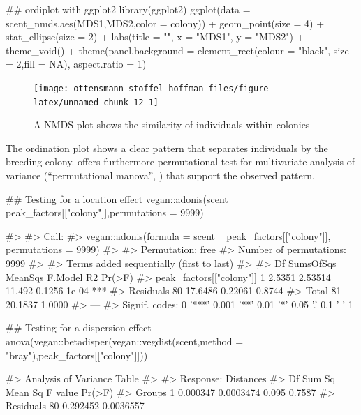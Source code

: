 \begin{Schunk}
\begin{Sinput}
## ordiplot with ggplot2
library(ggplot2)
ggplot(data = scent_nmds,aes(MDS1,MDS2,color = colony)) +
    geom_point(size = 4) + 
    stat_ellipse(size = 2) + 
    labs(title = "", x = "MDS1", y = "MDS2") +  
    theme_void() + 
    theme(panel.background = element_rect(colour = "black", size = 2,fill = NA),
          aspect.ratio = 1)
\end{Sinput}
\begin{figure}

{\centering \texttt{[image: ottensmann-stoffel-hoffman\_files/figure-latex/unnamed-chunk-12-1]} 

}

\caption[A NMDS plot shows the similarity of individuals within colonies]{A NMDS plot shows the similarity of individuals within colonies}\label{fig:unnamed-chunk-12}
\end{figure}
\end{Schunk}

The ordination plot shows a clear pattern that separates individuals by
the breeding colony.  offers furthermore permutational test
for multivariate analysis of variance (``permutational manova'',
\citep{Anderson.2001}) that support the observed pattern.

\begin{Schunk}
\begin{Sinput}
## Testing for a location effect
vegan::adonis(scent ~ peak_factors[["colony"]],permutations = 9999)
\end{Sinput}
\begin{Soutput}
#> 
#> Call:
#> vegan::adonis(formula = scent ~ peak_factors[["colony"]], permutations = 9999) 
#> 
#> Permutation: free
#> Number of permutations: 9999
#> 
#> Terms added sequentially (first to last)
#> 
#>                          Df SumsOfSqs MeanSqs F.Model     R2 Pr(>F)    
#> peak_factors[["colony"]]  1    2.5351 2.53514  11.492 0.1256  1e-04 ***
#> Residuals                80   17.6486 0.22061         0.8744           
#> Total                    81   20.1837                 1.0000           
#> ---
#> Signif. codes:  0 '***' 0.001 '**' 0.01 '*' 0.05 '.' 0.1 ' ' 1
\end{Soutput}
\begin{Sinput}
## Testing for a dispersion effect
anova(vegan::betadisper(vegan::vegdist(scent,method = "bray"),peak_factors[["colony"]]))
\end{Sinput}
\begin{Soutput}
#> Analysis of Variance Table
#> 
#> Response: Distances
#>           Df   Sum Sq   Mean Sq F value Pr(>F)
#> Groups     1 0.000347 0.0003474   0.095 0.7587
#> Residuals 80 0.292452 0.0036557
\end{Soutput}
\end{Schunk}

